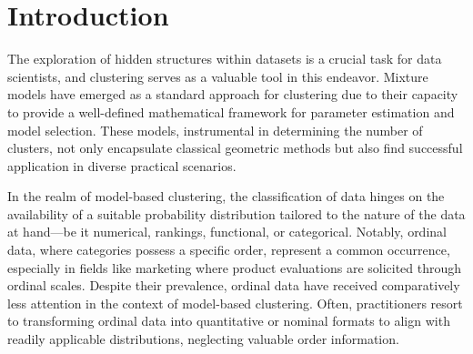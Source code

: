 
\section{Introduction}
The exploration of hidden structures within datasets is a crucial task for data scientists, and clustering serves as a valuable tool in this endeavor. Mixture models have emerged as a standard approach for clustering due to their capacity to provide a well-defined mathematical framework for parameter estimation and model selection. These models, instrumental in determining the number of clusters, not only encapsulate classical geometric methods but also find successful application in diverse practical scenarios.

In the realm of model-based clustering, the classification of data hinges on the availability of a suitable probability distribution tailored to the nature of the data at hand—be it numerical, rankings, functional, or categorical. Notably, ordinal data, where categories possess a specific order, represent a common occurrence, especially in fields like marketing where product evaluations are solicited through ordinal scales. Despite their prevalence, ordinal data have received comparatively less attention in the context of model-based clustering. Often, practitioners resort to transforming ordinal data into quantitative or nominal formats to align with readily applicable distributions, neglecting valuable order information.

